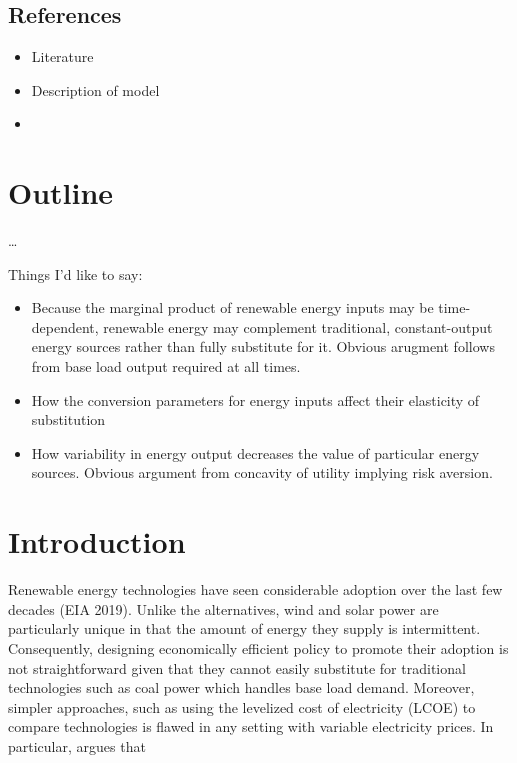 \documentclass[11pt,a4paper]{extarticle}
\begin{document}
\subsection{References}

\begin{itemize}
	\item Literature
	\item Description of model
	\item 
\end{itemize}



\section{Outline}
\dots

Things I'd like to say:
\begin{itemize}
	\item Because the marginal product of renewable energy inputs may be time-dependent, renewable energy may complement traditional, constant-output energy sources rather than fully substitute for it. Obvious arugment follows from base load output required at all times. 
	\item How the conversion parameters for energy inputs affect their elasticity of substitution
	\item How variability in energy output decreases the value of particular energy sources. Obvious argument from concavity of utility implying risk aversion. 
\end{itemize}

\pagebreak

\section{Introduction}

Renewable energy technologies have seen considerable adoption over the last few decades (EIA 2019). Unlike the alternatives, wind and solar power are particularly unique in that the amount of energy they supply is intermittent. Consequently, designing economically efficient policy to promote their adoption is not straightforward given that they cannot easily substitute for traditional technologies such as coal power which handles base load demand. Moreover, simpler approaches, such as using the levelized cost of electricity (LCOE) to compare technologies is flawed in any setting with variable electricity prices. In particular, \citet{Joskow2011} argues that 
\end{document}
